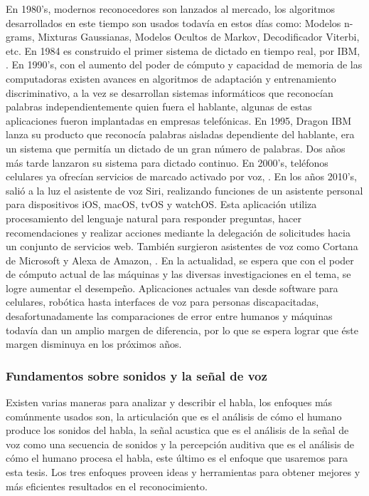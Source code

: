 \vskip 0.5cm
En 1980’s, modernos reconocedores son lanzados al mercado, los algoritmos desarrollados en este tiempo son usados todavía en estos días como: Modelos n-grams, Mixturas Gaussianas, Modelos Ocultos de Markov, Decodificador Viterbi, etc. En 1984 es construido el primer sistema de dictado en tiempo real, por IBM, \citep{orlando}.
\vskip 0.5cm
En 1990’s, con el aumento del poder de cómputo y capacidad de memoria de las computadoras existen avances en algoritmos de adaptación y entrenamiento discriminativo, a la vez se desarrollan sistemas informáticos que reconocían palabras independientemente quien fuera el hablante, algunas de estas aplicaciones fueron implantadas en empresas telefónicas. En 1995, Dragon IBM lanza su producto que reconocía palabras aisladas dependiente del hablante, era un sistema que permitía un dictado de un gran número de palabras. Dos años más tarde lanzaron su sistema para dictado continuo. En 2000’s, teléfonos celulares ya ofrecían servicios de marcado activado por voz, \citep{orlando}.
\vskip 0.5cm
En los años 2010’s, salió a la luz el asistente de voz Siri, realizando funciones de un asistente personal para dispositivos iOS, macOS, tvOS y watchOS. Esta aplicación utiliza procesamiento del lenguaje natural para responder preguntas, hacer recomendaciones y realizar acciones mediante la delegación de solicitudes hacia un conjunto de servicios web. También surgieron asistentes de voz como Cortana de Microsoft y Alexa de Amazon, \citep{timetoast2010}.
\vskip 0.5cm
En la actualidad, se espera que con el poder de cómputo actual de las máquinas y las diversas investigaciones en el tema, se logre aumentar el desempeño. Aplicaciones actuales van desde software para celulares, robótica hasta interfaces de voz para personas discapacitadas, desafortunadamente las comparaciones de error entre humanos y máquinas todavía dan un amplio margen de diferencia, por lo que se espera lograr que éste margen disminuya en los próximos años.

\subsubsection{Fundamentos sobre sonidos y la señal de voz}
Existen varias maneras para analizar y describir el habla, los enfoques más comúnmente usados son, la articulación que es el análisis de cómo el humano produce los sonidos del habla, la señal acustica que es el análisis de la señal de voz como una secuencia de sonidos y la percepción auditiva que es el análisis de cómo el humano procesa el habla, este último es el enfoque que usaremos para esta tesis. Los tres enfoques proveen ideas y herramientas para obtener mejores y más eficientes resultados en el reconocimiento.

